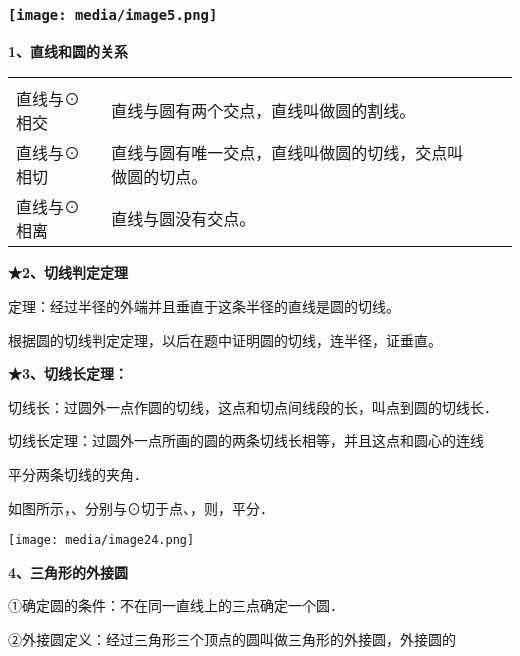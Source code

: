 \documentclass[a4paper,11pt,UTF8]{ctexart}
\begin{document}
\hypertarget{ux5b66ux79d1ux7f51www.zxxk.com--ux6559ux80b2ux8d44ux6e90ux95e8ux6237ux63d0ux4f9bux8bd5ux9898ux8bd5ux5377ux6559ux6848ux8bfeux4ef6ux6559ux5b66ux8bbaux6587ux7d20ux6750ux7b49ux5404ux7c7bux6559ux5b66ux8d44ux6e90ux5e93ux4e0bux8f7dux8fd8ux6709ux5927ux91cfux4e30ux5bccux7684ux6559ux5b66ux8d44ux8baf-19}{%
\subsubsection{\texorpdfstring{\protect\texttt{[image: media/image5.png]}}{学科网(www.zxxk.com)-\/-教育资源门户，提供试题试卷、教案、课件、教学论文、素材等各类教学资源库下载，还有大量丰富的教学资讯！}}\label{ux5b66ux79d1ux7f51www.zxxk.com--ux6559ux80b2ux8d44ux6e90ux95e8ux6237ux63d0ux4f9bux8bd5ux9898ux8bd5ux5377ux6559ux6848ux8bfeux4ef6ux6559ux5b66ux8bbaux6587ux7d20ux6750ux7b49ux5404ux7c7bux6559ux5b66ux8d44ux6e90ux5e93ux4e0bux8f7dux8fd8ux6709ux5927ux91cfux4e30ux5bccux7684ux6559ux5b66ux8d44ux8baf-19}}

\textbf{1、直线和圆的关系}

\begin{longtable}[]{@{}llll@{}}
\toprule
\endhead
& & &\tabularnewline
直线与⊙相交 & 直线与圆有两个交点，直线叫做圆的割线。 & &\tabularnewline
直线与⊙相切 & 直线与圆有唯一交点，直线叫做圆的切线，交点叫做圆的切点。 &
&\tabularnewline
直线与⊙相离 & 直线与圆没有交点。 & &\tabularnewline
\bottomrule
\end{longtable}

\textbf{★2、切线判定定理}

定理：经过半径的外端并且垂直于这条半径的直线是圆的切线。

根据圆的切线判定定理，以后在题中证明圆的切线，连半径，证垂直。

\textbf{★3、切线长定理：}

切线长：过圆外一点作圆的切线，这点和切点间线段的长，叫点到圆的切线长．

切线长定理：过圆外一点所画的圆的两条切线长相等，并且这点和圆心的连线

平分两条切线的夹角．

如图所示，、分别与⊙切于点、，则，平分．

\texttt{[image: media/image24.png]}

\textbf{4、三角形的外接圆}

①确定圆的条件：不在同一直线上的三点确定一个圆．

②外接圆定义：经过三角形三个顶点的圆叫做三角形的外接圆，外接圆的
\end{document}
